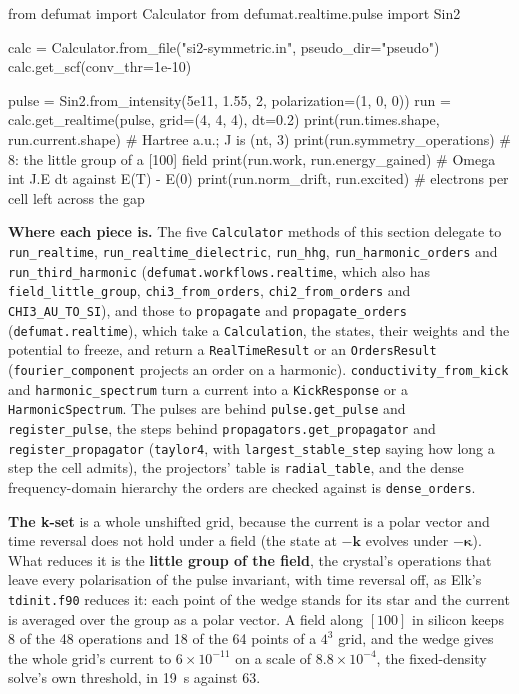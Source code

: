 \documentclass[11pt,a4paper]{article}
\newcommand{\code}[1]{\texttt{\small #1}}
\begin{document}
\begin{pycode}
from defumat import Calculator
from defumat.realtime.pulse import Sin2

calc = Calculator.from_file("si2-symmetric.in", pseudo_dir="pseudo")
calc.get_scf(conv_thr=1e-10)

pulse = Sin2.from_intensity(5e11, 1.55, 2, polarization=(1, 0, 0))
run = calc.get_realtime(pulse, grid=(4, 4, 4), dt=0.2)
print(run.times.shape, run.current.shape)   # Hartree a.u.; J is (nt, 3)
print(run.symmetry_operations)              # 8: the little group of a [100] field
print(run.work, run.energy_gained)          # Omega int J.E dt against E(T) - E(0)
print(run.norm_drift, run.excited)          # electrons per cell left across the gap
\end{pycode}

\textbf{Where each piece is.} The five \code{Calculator} methods of this section
delegate to \code{run\_realtime}, \code{run\_realtime\_dielectric},
\code{run\_hhg}, \code{run\_harmonic\_orders} and \code{run\_third\_harmonic}
(\code{defumat.workflows.realtime}, which also has \code{field\_little\_group},
\code{chi3\_from\_orders}, \code{chi2\_from\_orders} and \code{CHI3\_AU\_TO\_SI}),
and those to \code{propagate} and \code{propagate\_orders} (\code{defumat.realtime}),
which take a \code{Calculation}, the states, their weights and the potential to
freeze, and return a \code{RealTimeResult} or an \code{OrdersResult}
(\code{fourier\_component} projects an order on a harmonic). \code{conductivity\_from\_kick}
and \code{harmonic\_spectrum} turn a current into a \code{KickResponse} or a
\code{HarmonicSpectrum}. The pulses are behind \code{pulse.get\_pulse} and
\code{register\_pulse}, the steps behind \code{propagators.get\_propagator} and
\code{register\_propagator} (\code{taylor4}, with \code{largest\_stable\_step}
saying how long a step the cell admits), the projectors' table is
\code{radial\_table}, and the dense frequency-domain hierarchy the orders are
checked against is \code{dense\_orders}.

\textbf{The k-set} is a whole unshifted grid, because the current is a polar
vector and time reversal does not hold under a field (the state at
$-\mathbf k$ evolves under $-\boldsymbol\kappa$). What reduces it is the
\textbf{little group of the field}, the crystal's operations that leave every
polarisation of the pulse invariant, with time reversal off, as Elk's
\code{tdinit.f90} reduces it: each point of the wedge stands for its star and the
current is averaged over the group as a polar vector. A field along $[100]$ in
silicon keeps 8 of the 48 operations and 18 of the 64 points of a $4^3$ grid, and
the wedge gives the whole grid's current to $6\times10^{-11}$ on a scale of
$8.8\times10^{-4}$, the fixed-density solve's own threshold, in 19~s against 63.
\end{document}

